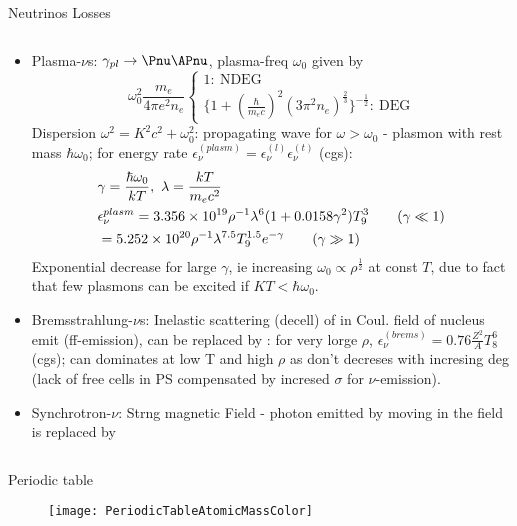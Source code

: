 \begin{frame}{Neutrinos Losses}
\begin{columns}[T]
\begin{column}{0.55\textwidth}
    \begin{itemize}
                    \item Plasma-$\nu$s: $\gamma_{pl}\to\Pnu\APnu$, plasma-freq $\omega_0$ given by
                        \[\omega_0^2 \frac{m_e}{4\pi e^2n_e}\left\{
                            \begin{array}{l}
                                1:\ \text{NDEG}\\
                                \{1+(\frac{\hbar}{m_ec})^2(3\pi^2n_e)^{\frac{2}{3}}\}^{-\frac{1}{2}}:\ \text{DEG}
                        \end{array}
                \right.\]
                Dispersion $\omega^2=K^2c^2+\omega_0^2$: propagating wave for $\omega>\omega_0$ - plasmon with rest mass $\hbar\omega_0$; for energy rate $\epsilon_{\nu}^{(plasm)}=\epsilon_{\nu}^{(l)}\epsilon_{\nu}^{(t)}$ (cgs):
                \begin{align*}
                    &\gamma=\frac{\hbar\omega_0}{kT},\ \lambda=\frac{kT}{m_ec^2}\\
                    &\epsilon_{\nu}^{plasm}=\num{3.356e19}\invers{\rho}\lambda^6(1+0.0158\gamma^2)T_9^3\tag{$\gamma\ll1$}\\
                    &=\num{5.252e20}\invers{\rho}\lambda^{7.5}T_9^{1.5}\exp{-\gamma}\tag{$\gamma\gg1$}
                \end{align*}
                        Exponential decrease for large $\gamma$, ie increasing $\omega_0\propto\rho^{\frac{1}{2}}$ at const $T$, due to fact that few plasmons can be excited if $KT<\hbar\omega_0$.
                    \item Bremsstrahlung-$\nu$s: Inelastic scattering (decell) of \Pelectron in Coul. field of nucleus emit \Pgamma (ff-emission), \Pgamma can be replaced by \Pnu\APnu: for very lorge $\rho$, $\epsilon_{\nu}^{(brems)}=\num{0.76}\frac{Z^2}{A}T_8^6$ (cgs); can dominates at low T and high $\rho$ as don't decreses with incresing deg (lack of free cells in PS compensated by incresed $\sigma$ for $\nu$-emission).
                    \item Synchrotron-$\nu$: Strng magnetic Field - photon emitted by \Pelectron moving in the field is replaced by \Pnu\APnu
        \end{itemize}
        \end{column}
    \end{columns}
\end{frame}

\begin{frame}{Periodic table}
    
\begin{figure}[!ht]
    \texttt{[image: PeriodicTableAtomicMassColor]}\label{fig:PeriodicTableAtomicMassColor}
\end{figure}
\end{frame}

